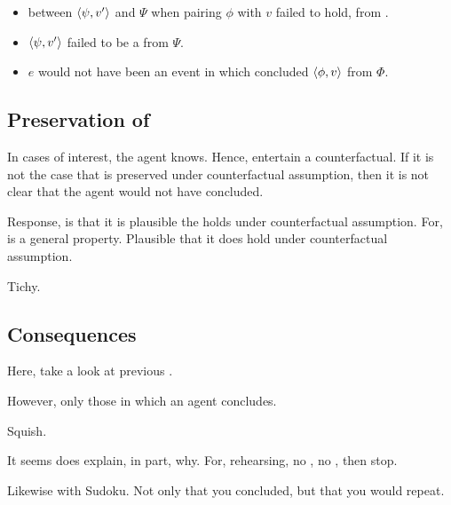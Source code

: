 \begin{note}
    \begin{itemize}
  \item
     between \(\langle \psi, v' \rangle\) and \(\Psi\) when pairing \(\phi\) with \(v\) failed to hold, from .
  \item
    \(\langle \psi, v' \rangle\) failed to be a \fc{} from \(\Psi\).
  \item
    \(e\) would not have been an event in which \vAgent{} concluded \(\langle \phi, v \rangle\) from \(\Phi\).
  \end{itemize}
\end{note}

\subsection{Preservation of \requ{}}
\label{sec:preservation-requ}

\begin{note}
  In cases of interest, the agent knows.
  Hence, entertain a counterfactual.
  If it is not the case that \requ{} is preserved under counterfactual assumption, then it is not clear that the agent would not have concluded.
\end{note}

\begin{note}
  Response, is that it is plausible the \requ{} holds under counterfactual assumption.
  For, \requ{} is a general property.
  Plausible that it does hold under counterfactual assumption.

  Tichy.
\end{note}

\subsection{Consequences}
\label{sec:consequences}

\begin{note}
  Here, take a look at previous .

  However, only those in which an agent concludes.
\end{note}

\begin{note}
  Squish.

  It seems does explain, in part, why.
  For, rehearsing, no \ros{}, no \fc{}, then stop.

  Likewise with Sudoku.
  Not only that you concluded, but that you would repeat.
\end{note}

